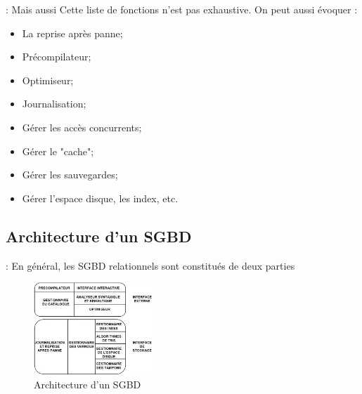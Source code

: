 \documentclass[10pt]{beamer}
\begin{document}
\begin{frame}{\subsecname : Mais aussi}
    Cette liste de fonctions n’est pas exhaustive. On peut aussi évoquer :
    \begin{itemize}
        \item La reprise après panne;
        \item Précompilateur;
        \item Optimiseur;
        \item Journalisation;
        \item Gérer les accès concurrents;
        \item Gérer le "cache";
        \item Gérer les sauvegardes;
        \item Gérer l'espace disque, les index, etc.
    \end{itemize}
\end{frame}

\subsection{Architecture d’un SGBD}
\begin{frame}{\secname : \subsecname}
    En général, les SGBD relationnels sont constitués de deux parties
    \begin{figure}
        \begin{center}
            \includegraphics[width=0.4\textwidth]{../assets/img/architecture_sgbd.jpg}
            \caption{Architecture d’un SGBD}
            \label{Fig:architecturesgbd}
        \end{center}
    \end{figure}
\end{frame}
\end{document}
